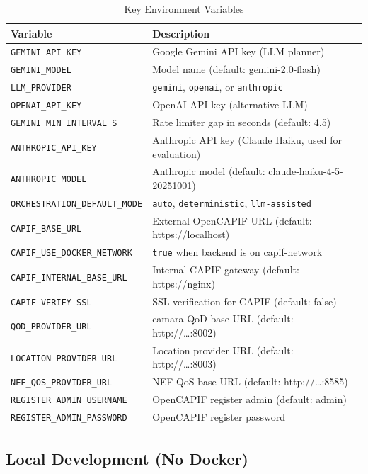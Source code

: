\documentclass[conference]{IEEEtran}
\begin{document}
\begin{table}[H]
\centering
\caption{Key Environment Variables}
\label{tab:envvars}
\scriptsize
\begin{tabularx}{\columnwidth}{lX}
\toprule
\textbf{Variable} & \textbf{Description} \\
\midrule
\texttt{GEMINI\_API\_KEY} & Google Gemini API key (LLM planner) \\
\texttt{GEMINI\_MODEL} & Model name (default: gemini-2.0-flash) \\
\texttt{LLM\_PROVIDER} & \texttt{gemini}, \texttt{openai}, or \texttt{anthropic} \\
\texttt{OPENAI\_API\_KEY} & OpenAI API key (alternative LLM) \\
\texttt{GEMINI\_MIN\_INTERVAL\_S} & Rate limiter gap in seconds (default: 4.5) \\
\texttt{ANTHROPIC\_API\_KEY} & Anthropic API key (Claude Haiku, used for evaluation) \\
\texttt{ANTHROPIC\_MODEL} & Anthropic model (default: claude-haiku-4-5-20251001) \\
\texttt{ORCHESTRATION\_DEFAULT\_MODE} & \texttt{auto}, \texttt{deterministic}, \texttt{llm-assisted} \\
\texttt{CAPIF\_BASE\_URL} & External OpenCAPIF URL (default: https://localhost) \\
\texttt{CAPIF\_USE\_DOCKER\_NETWORK} & \texttt{true} when backend is on capif-network \\
\texttt{CAPIF\_INTERNAL\_BASE\_URL} & Internal CAPIF gateway (default: https://nginx) \\
\texttt{CAPIF\_VERIFY\_SSL} & SSL verification for CAPIF (default: false) \\
\texttt{QOD\_PROVIDER\_URL} & camara-QoD base URL (default: http://\ldots:8002) \\
\texttt{LOCATION\_PROVIDER\_URL} & Location provider URL (default: http://\ldots:8003) \\
\texttt{NEF\_QOS\_PROVIDER\_URL} & NEF-QoS base URL (default: http://\ldots:8585) \\
\texttt{REGISTER\_ADMIN\_USERNAME} & OpenCAPIF register admin (default: admin) \\
\texttt{REGISTER\_ADMIN\_PASSWORD} & OpenCAPIF register password \\
\bottomrule
\end{tabularx}
\end{table}

\subsection{Local Development (No Docker)}
\end{document}
